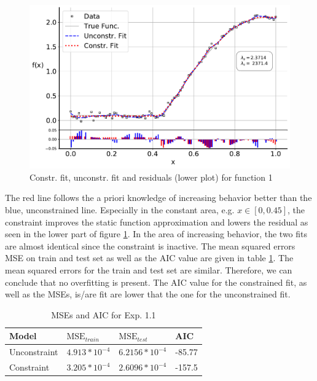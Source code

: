 \documentclass[10pt,a4paper]{article}
\begin{document}
\begin{figure}[H]
	\centering
	\includegraphics[width=\columnwidth]{../thesisplots/exp_inc1_fit.pdf}
	\caption{Constr. fit, unconstr. fit and residuals (lower plot) for function 1}
	\label{fig:test_func_1_fit}
\end{figure}

The red line follows the a priori knowledge of increasing behavior better than the blue, unconstrained line. Especially in the constant area, e.g. $x \in  [0, 0.45]$, the constraint improves the static function approximation and lowers the residual as seen in the lower part of figure \ref{fig:test_func_1_fit}. In the area of increasing behavior, the two fits are almost identical since the constraint is inactive. The mean squared errors MSE on train and test set as well as the AIC value are given in table \ref{tab:metrics_1-1}. The mean squared errors for the train and test set are similar. Therefore, we can conclude that no overfitting is present. The AIC value for the constrained fit, as well as the MSEs, is/are fit are lower that the one for the unconstrained fit. 

\begin{table}[h]
	\centering
	\begin{tabular}{|l|l|l|l|}
		\hline
		\textbf{Model} & \textbf{$\text{MSE}_{train}$} & \textbf{$\text{MSE}_{test}$}  & \textbf{AIC} \\ \hline \toprule
		Unconstraint   & $4.913 * 10^{-4}$  & $6.2156 * 10^{-4}$ & -85.77       \\ \hline
		Constraint     & $3.205* 10^{-4}$   & $2.6096 * 10^{-4}$ & -157.5       \\ \hline \bottomrule
	\end{tabular}
	\caption{MSEs and AIC for Exp. 1.1}
	\label{tab:metrics_1-1}
\end{table}
\end{document}
